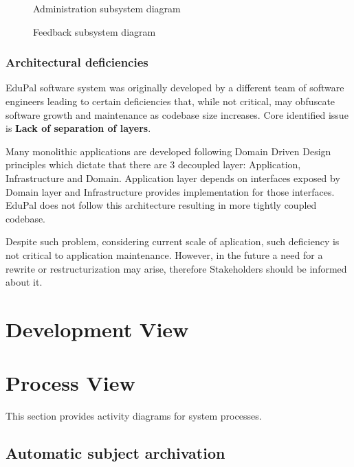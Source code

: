\documentclass[
    english, %
]{VUMIFPSkursinis}
\begin{document}
\begin{figure}[ht]
    \centering
    
    \caption{Administration subsystem diagram}
    \label{administration-model}
\end{figure}

\begin{figure}[ht]
    \centering
    
    \caption{Feedback subsystem diagram}
    \label{feedback-model}
\end{figure}

\subsubsection{Architectural deficiencies}

EduPal software system was originally developed by a different team of software engineers leading to certain deficiencies that, while not critical, may obfuscate software growth and maintenance as codebase size increases. Core identified issue is \textbf{Lack of separation of layers}.

Many monolithic applications are developed following Domain Driven Design principles which dictate that there are 3 decoupled layer: Application, Infrastructure and Domain. Application layer depends on interfaces exposed by Domain layer and Infrastructure provides implementation for those interfaces. EduPal does not follow this architecture resulting in more tightly coupled codebase.

Despite such problem, considering current scale of aplication, such deficiency is not critical to application maintenance. However, in the future a need for a rewrite or restructurization may arise, therefore Stakeholders should be informed about it.

\section{Development View}

\section{Process View}

This section provides activity diagrams for system processes.

\subsection{Automatic subject archivation}
\end{document}
